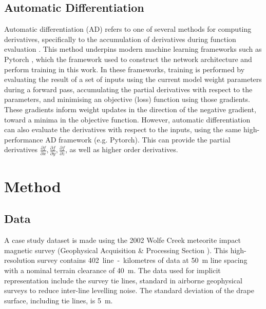 \documentclass[manuscript.tex]{subfiles}
\begin{document}
\subsection{Automatic Differentiation}
Automatic differentiation (AD) refers to one of several methods for computing derivatives, specifically to the accumulation of derivatives during function evaluation \parencite{baydin2018automatic}.
This method underpins modern machine learning frameworks such as Pytorch \parencite{paszkePyTorchImperativeStyle2019}, which the framework used to construct the network architecture and perform training in this work.
In these frameworks, training is performed by evaluating the result of a set of inputs using the current model weight parameters during a forward pass, accumulating the partial derivatives with respect to the parameters, and minimising an objective (loss) function using those gradients.
These gradients inform weight updates in the direction of the negative gradient, toward a minima in the objective function.
However, automatic differentiation can also evaluate the derivatives with respect to the inputs, using the same high-performance AD framework (e.g. Pytorch).
This can provide the partial derivatives \(\frac{\partial f}{\partial x}, \frac{\partial f}{\partial y}, \frac{\partial f}{\partial z}\), as well as higher order derivatives.

\section{Method}

\subsection{Data}
A case study dataset is made using the 2002 Wolfe Creek meteorite impact magnetic survey (Geophysical Acquisition \& Processing Section \cite*{wolfecreek2019}).
This high-resolution survey contains \SI{402}{line-kilometres} of data at \SI{50}{\m} line spacing with a nominal terrain clearance of \SI{40}{\m}.
The data used for implicit representation include the survey tie lines, standard in airborne geophysical surveys to reduce inter-line levelling noise.
The standard deviation of the drape surface, including tie lines, is \SI{5}{\m}.
\end{document}
